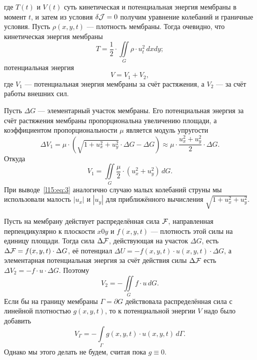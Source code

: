 где $T(t)$ и $V(t)$ суть кинетическая и потенциальная энергия мембраны в момент $t$,
и затем из условия $\delta\mathcal{J}=0$ получим уравнение колебаний и граничные условия. Пусть $\rho(x,y,t)$ --- плотность мембраны. Тогда очевидно, что кинетическая энергия мембраны 
\begin{equation}\label{l15:eq:1}
	 T=\frac{1}{2}\cdot\iint\limits_{G}\rho\cdot u_t^2\,dxdy;
\end{equation} 
потенциальная энергия
\begin{equation}\label{l15:eq:2}
	 V=V_1+V_2,
\end{equation} 
где $V_1$ --- потенциальная энергия мембраны за счёт растяжения, а $V_2$ --- за счёт работы внешних сил.

Пусть $\Delta G$ --- элементарный участок мембраны. Его потенциальная энергия за счёт растяжения мембраны пропорциональна увеличению площади, а коэффициентом пропорциональности $\mu$ является модуль упругости
\begin{equation*}
	\Delta V_1=\mu\cdot\left(\sqrt{1+u_x^2+u_y^2}\cdot\Delta G-\Delta G\right)\approx\mu\cdot\frac{u_x^2+u_y^2}{2}\cdot\Delta G.
\end{equation*}
Откуда
\begin{equation}\label{l15:eq:3}
	 V_1=\iint\limits_{G}\frac{\mu}{2}\cdot(u_x^2+u_y^2)\,dG.
\end{equation}
При выводе~\eqref{l15:eq:3} аналогично случаю малых колебаний струны мы использовали малость $|u_x|$ и $|u_y|$ для приближённого вычисления $\sqrt{1+u_x^2+u_y^2}$.

Пусть на мембрану действует распределённая сила $\mathcal{F}$, направленная перпендикулярно к плоскости $x0y$ и $f(x,y,t)$ --- плотность этой силы на единицу площади. Тогда сила $\Delta\mathcal{F}$, действующая на участок $\Delta G$, есть $\Delta\mathcal{F}=f(x,y,t)\cdot\Delta G$, её потенциал $\Delta U=-f(x,y,t)\cdot u(x,y,t)\cdot\Delta G$, а элементарная потенциальная энергия за счёт действия силы $\Delta \mathcal{F}$ есть $\Delta V_{2}=-f\cdot u\cdot\Delta G$. Поэтому 
\begin{equation}\label{l15:eq:4}
	 V_{2}=-\iint\limits_{G}f\cdot u\,dG.
\end{equation}
Если бы на границу мембраны $\Gamma=\partial G$ действовала распределённая сила с линейной плотностью $g(x,y,t)$, то к потенциальной энергии $V$ надо было добавить
\begin{equation}\label{l15:eq:5}
	 V_{\Gamma}=-\int\limits_{\Gamma}g(x,y,t)\cdot u(x,y,t)\,d\Gamma.
\end{equation}  
Однако мы этого делать не будем, считая пока $g\equiv0$.

